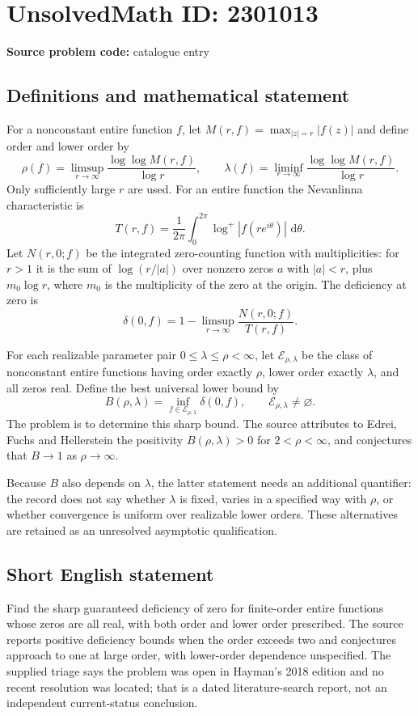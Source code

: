 \documentclass[11pt]{article}
\newcommand{\dd}{\,\mathrm{d}}
\begin{document}
\section*{UnsolvedMath ID: 2301013}
\textbf{Source problem code:} catalogue entry
\subsection{Definitions and mathematical statement}
For a nonconstant entire function $f$, let $M(r,f)=\max_{|z|=r}|f(z)|$ and define order and lower order by
\[
 \rho(f)=\limsup_{r\to\infty}\frac{\log\log M(r,f)}{\log r},\qquad
 \lambda(f)=\liminf_{r\to\infty}\frac{\log\log M(r,f)}{\log r}.
\]
Only sufficiently large $r$ are used. For an entire function the Nevanlinna characteristic is
\[
 T(r,f)=\frac1{2\pi}\int_0^{2\pi}\log^+|f(re^{i\theta})|\,\dd\theta.
\]
Let $N(r,0;f)$ be the integrated zero-counting function with multiplicities: for $r>1$ it is the sum of $\log(r/|a|)$ over nonzero zeros $a$ with $|a|<r$, plus $m_0\log r$, where $m_0$ is the multiplicity of the zero at the origin. The deficiency at zero is
\[
 \delta(0,f)=1-\limsup_{r\to\infty}\frac{N(r,0;f)}{T(r,f)}.
\]

For each realizable parameter pair $0\leq\lambda\leq\rho<\infty$, let $\mathcal E_{\rho,\lambda}$ be the class of nonconstant entire functions having order exactly $\rho$, lower order exactly $\lambda$, and all zeros real. Define the best universal lower bound by
\[
 B(\rho,\lambda)=\inf_{f\in\mathcal E_{\rho,\lambda}}\delta(0,f),
 \qquad\mathcal E_{\rho,\lambda}\ne\varnothing.
\]
The problem is to determine this sharp bound. The source attributes to Edrei, Fuchs and Hellerstein the positivity $B(\rho,\lambda)>0$ for $2<\rho<\infty$, and conjectures that $B\to1$ as $\rho\to\infty$.

Because $B$ also depends on $\lambda$, the latter statement needs an additional quantifier: the record does not say whether $\lambda$ is fixed, varies in a specified way with $\rho$, or whether convergence is uniform over realizable lower orders. These alternatives are retained as an unresolved asymptotic qualification.
\subsection{Short English statement}
Find the sharp guaranteed deficiency of zero for finite-order entire functions whose zeros are all real, with both order and lower order prescribed. The source reports positive deficiency bounds when the order exceeds two and conjectures approach to one at large order, with lower-order dependence unspecified. The supplied triage says the problem was open in Hayman's 2018 edition and no recent resolution was located; that is a dated literature-search report, not an independent current-status conclusion.
\end{document}
